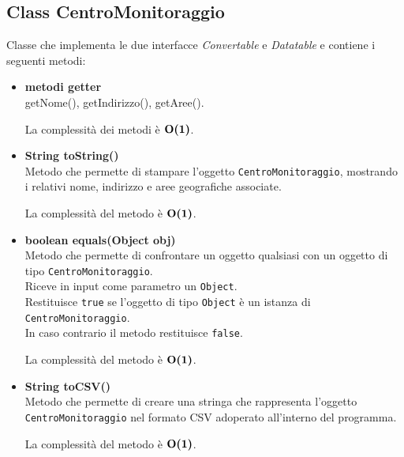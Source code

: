 \documentclass[a4paper, 12pt]{scrreprt}
\begin{document}
			\subsection{Class CentroMonitoraggio}
			Classe che implementa le due interfacce \textsl{Convertable} e \textsl{Datatable} e contiene i seguenti metodi:
			\begin{itemize}
				\item \textbf{metodi getter}
				\\getNome(), getIndirizzo(), getAree().
				
				La complessit\`a dei metodi \`e $\mathbf{O}\textbf{(1)}$.
				
				\item \textbf{String toString()}
				\\Metodo che permette di stampare l'oggetto \verb!CentroMonitoraggio!, mostrando i relativi nome, indirizzo e aree geografiche associate.
				
				La complessit\`a del metodo \`e $\mathbf{O}\textbf{(1)}$.
				
				\item \textbf{boolean equals(Object obj)}
				\\Metodo che permette di confrontare un oggetto qualsiasi con un oggetto di tipo \verb!CentroMonitoraggio!.
				\\Riceve in input come parametro un \verb!Object!.
				\\Restituisce \verb!true! se l'oggetto di tipo \verb!Object! \`e un istanza di \verb!CentroMonitoraggio!.
				\\In caso contrario il metodo restituisce \verb!false!.
				
				La complessit\`a del metodo \`e $\mathbf{O}\textbf{(1)}$.
				
				\item \textbf{String toCSV()}
				\\Metodo che permette di creare una stringa che rappresenta l'oggetto \verb!CentroMonitoraggio! nel formato CSV adoperato all'interno del programma.
				
				La complessit\`a del metodo \`e $\mathbf{O}\textbf{(1)}$.
				
			\end{itemize}
\pagebreak
\end{document}
